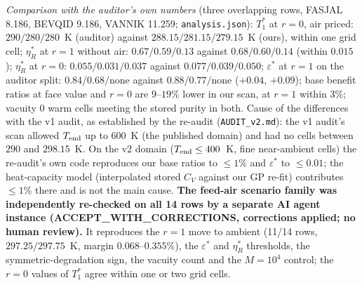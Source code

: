 \documentclass[10pt]{article}
\begin{document}
\emph{Comparison with the auditor's own numbers} (three overlapping rows, FASJAL 8.186, BEVQID 9.186, VANNIK 11.259; \texttt{analysis.json}): $T_1^\ast$ at $r=0$, air priced: $290/280/280$~K (auditor) against $288.15/281.15/279.15$~K (ours), within one grid cell; $\eta_R^\ast$ at $r=1$ without air: $0.67/0.59/0.13$ against $0.68/0.60/0.14$ (within $0.015$); $\eta_R^\ast$ at $r=0$: $0.055/0.031/0.037$ against $0.077/0.039/0.050$; $\varepsilon^\ast$ at $r=1$ on the auditor split: $0.84/0.68/$none against $0.88/0.77/$none ($+0.04$, $+0.09$); base benefit ratios at face value and $r=0$ are $9$--$19\%$ lower in our scan, at $r=1$ within $3\%$; vacuity $0$ warm cells meeting the stored purity in both. Cause of the differences with the v1 audit, as established by the re-audit (\texttt{AUDIT\_v2.md}): the v1 audit's scan allowed $T_{\rm end}$ up to 600~K (the published domain) and had no cells between $290$ and $298.15$~K. On the v2 domain ($T_{\rm end}\le400$~K, fine near-ambient cells) the re-audit's own code reproduces our base ratios to $\le1\%$ and $\varepsilon^\ast$ to $\le0.01$; the heat-capacity model (interpolated stored $C_V$ against our GP re-fit) contributes $\le1\%$ there and is not the main cause. \textbf{The feed-air scenario family was independently re-checked on all 14 rows by a separate AI agent instance (ACCEPT\_WITH\_CORRECTIONS, corrections applied; no human review).} It reproduces the $r=1$ move to ambient (11/14 rows, $297.25/297.75$~K, margin $0.068$--$0.355\%$), the $\varepsilon^\ast$ and $\eta_R^\ast$ thresholds, the symmetric-degradation sign, the vacuity count and the $M=10^4$ control; the $r=0$ values of $T_1^\ast$ agree within one or two grid cells.
\end{document}

